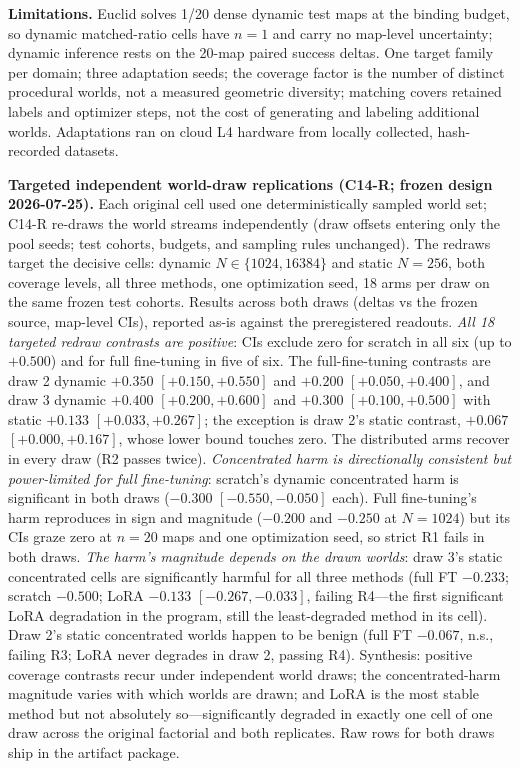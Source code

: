 \documentclass[letterpaper]{article} %
\begin{document}
\textbf{Limitations.} Euclid solves 1/20 dense dynamic test maps at the binding budget, so dynamic matched-ratio cells have $n{=}1$ and carry no map-level uncertainty; dynamic inference rests on the 20-map paired success deltas. One target family per domain; three adaptation seeds; the coverage factor is the number of distinct procedural worlds, not a measured geometric diversity; matching covers retained labels and optimizer steps, not the cost of generating and labeling additional worlds. Adaptations ran on cloud L4 hardware from locally collected, hash-recorded datasets.

\textbf{Targeted independent world-draw replications (C14-R; frozen design 2026-07-25).} Each original cell used one deterministically sampled world set; C14-R re-draws the world streams independently (draw offsets entering only the pool seeds; test cohorts, budgets, and sampling rules unchanged). The redraws target the decisive cells: dynamic $N \in \{1024, 16384\}$ and static $N{=}256$, both coverage levels, all three methods, one optimization seed, 18 arms per draw on the same frozen test cohorts. Results across both draws (deltas vs the frozen source, map-level CIs), reported as-is against the preregistered readouts. \emph{All 18 targeted redraw contrasts are positive}: CIs exclude zero for scratch in all six (up to $+0.500$) and for full fine-tuning in five of six. The full-fine-tuning contrasts are draw 2 dynamic $+0.350$ $[+0.150,+0.550]$ and $+0.200$ $[+0.050,+0.400]$, and draw 3 dynamic $+0.400$ $[+0.200,+0.600]$ and $+0.300$ $[+0.100,+0.500]$ with static $+0.133$ $[+0.033,+0.267]$; the exception is draw 2's static contrast, $+0.067$ $[+0.000,+0.167]$, whose lower bound touches zero. The distributed arms recover in every draw (R2 passes twice). \emph{Concentrated harm is directionally consistent but power-limited for full fine-tuning}: scratch's dynamic concentrated harm is significant in both draws ($-0.300$ $[-0.550,-0.050]$ each). Full fine-tuning's harm reproduces in sign and magnitude ($-0.200$ and $-0.250$ at $N{=}1024$) but its CIs graze zero at $n{=}20$ maps and one optimization seed, so strict R1 fails in both draws. \emph{The harm's magnitude depends on the drawn worlds}: draw 3's static concentrated cells are significantly harmful for all three methods (full FT $-0.233$; scratch $-0.500$; LoRA $-0.133$ $[-0.267,-0.033]$, failing R4---the first significant LoRA degradation in the program, still the least-degraded method in its cell). Draw 2's static concentrated worlds happen to be benign (full FT $-0.067$, n.s., failing R3; LoRA never degrades in draw 2, passing R4). Synthesis: positive coverage contrasts recur under independent world draws; the concentrated-harm magnitude varies with which worlds are drawn; and LoRA is the most stable method but not absolutely so---significantly degraded in exactly one cell of one draw across the original factorial and both replicates. Raw rows for both draws ship in the artifact package.
\end{document}
